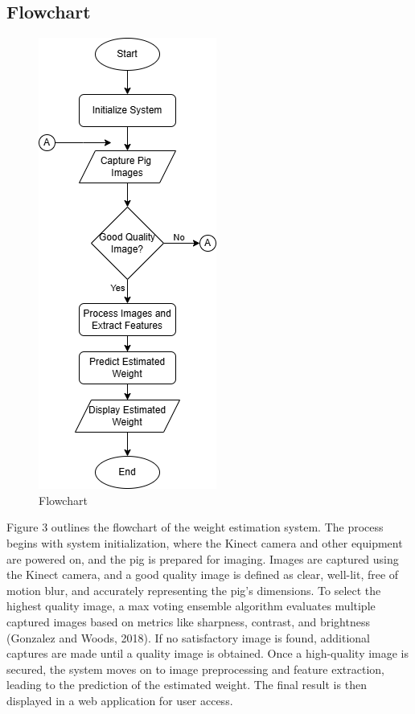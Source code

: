 {\subsection {Flowchart}
\begin{figure}[h]
	\centering
	\includegraphics[height=0.6\textheight]{figures/kinectpigNIGGA}
	\caption{Flowchart}
	\label{fig:Flowchart}
\end{figure}

Figure 3 outlines the flowchart of the weight estimation system. The process begins with system initialization, where the Kinect camera and other equipment are powered on, and the pig is prepared for imaging. Images are captured using the Kinect camera, and a good quality image is defined as clear, well-lit, free of motion blur, and accurately representing the pig's dimensions. To select the highest quality image, a max voting ensemble algorithm evaluates multiple captured images based on metrics like sharpness, contrast, and brightness (Gonzalez and Woods, 2018). If no satisfactory image is found, additional captures are made until a quality image is obtained. Once a high-quality image is secured, the system moves on to image preprocessing and feature extraction, leading to the prediction of the estimated weight. The final result is then displayed in a web application for user access.
}
